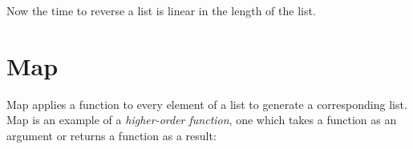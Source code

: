 \begin{fence}
\begin{code}
\AgdaInductiveConstructor{[]}\AgdaSymbol{)}\<%
\\
%
\>[2]\<%
\\
\>[2][@{}l@{\AgdaIndent{0}}]%
\>[4]\AgdaSpace{}%
\AgdaSymbol{(}\AgdaSpace{}%
\AgdaSpace{}%
\AgdaInductiveConstructor{[]}\AgdaSymbol{)}\AgdaSpace{}%
\AgdaSymbol{(}\AgdaSpace{}%
\AgdaSpace{}%
\AgdaSpace{}%
\AgdaSpace{}%
\AgdaInductiveConstructor{[]}\AgdaSymbol{)}\<%
\\
%
\>[2]\<%
\\
\>[2][@{}l@{\AgdaIndent{0}}]%
\>[4]\AgdaSpace{}%
\AgdaInductiveConstructor{[]}\AgdaSpace{}%
\AgdaSymbol{(}\AgdaSpace{}%
\AgdaSpace{}%
\AgdaSpace{}%
\AgdaSpace{}%
\AgdaSpace{}%
\AgdaSpace{}%
\AgdaInductiveConstructor{[]}\AgdaSymbol{)}\<%
\\
%
\>[2]\<%
\\
\>[2][@{}l@{\AgdaIndent{0}}]%
\>[4]\AgdaSpace{}%
\AgdaSpace{}%
\AgdaSpace{}%
\AgdaSpace{}%
\AgdaSpace{}%
\AgdaSpace{}%
\AgdaInductiveConstructor{[]}\<%
\\
%
\>[2]\<%
\end{code}
\end{fence}

Now the time to reverse a list is linear in the length of the list.

\hypertarget{Lists-Map}{%
\section{Map}\label{Lists-Map}}

Map applies a function to every element of a list to generate a
corresponding list. Map is an example of a \emph{higher-order function},
one which takes a function as an argument or returns a function as a
result:

